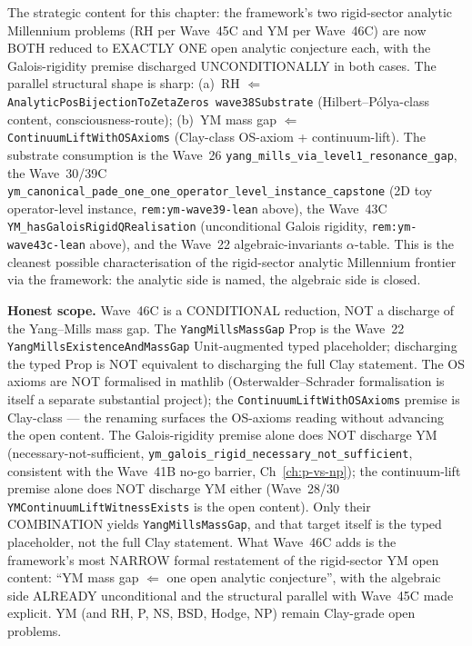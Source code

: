 \begin{remark}
\begin{itemize}
\end{itemize}
The strategic content for this chapter: the framework's two rigid-sector analytic Millennium problems (RH per Wave~45C and YM per Wave~46C) are now BOTH reduced to EXACTLY ONE open analytic conjecture each, with the Galois-rigidity premise discharged UNCONDITIONALLY in both cases. The parallel structural shape is sharp: (a)~RH $\Leftarrow$ \texttt{AnalyticPosBijectionToZetaZeros wave38Substrate} (Hilbert--P\'olya-class content, consciousness-route); (b)~YM mass gap $\Leftarrow$ \texttt{ContinuumLiftWithOSAxioms} (Clay-class OS-axiom + continuum-lift). The substrate consumption is the Wave~26 \texttt{yang\_mills\_via\_level1\_resonance\_gap}, the Wave~30/39C \texttt{ym\_canonical\_pade\_one\_one\_operator\_level\_instance\_capstone} (2D toy operator-level instance, \texttt{rem:ym-wave39-lean} above), the Wave~43C \texttt{YM\_hasGaloisRigidQRealisation} (unconditional Galois rigidity, \texttt{rem:ym-wave43c-lean} above), and the Wave~22 algebraic-invariants $\alpha$-table. This is the cleanest possible characterisation of the rigid-sector analytic Millennium frontier via the framework: the analytic side is named, the algebraic side is closed.

\textbf{Honest scope.} Wave~46C is a CONDITIONAL reduction, NOT a discharge of the Yang--Mills mass gap. The \texttt{YangMillsMassGap} Prop is the Wave~22 \texttt{YangMillsExistenceAndMassGap} Unit-augmented typed placeholder; discharging the typed Prop is NOT equivalent to discharging the full Clay statement. The OS axioms are NOT formalised in mathlib (Osterwalder--Schrader formalisation is itself a separate substantial project); the \texttt{ContinuumLiftWithOSAxioms} premise is Clay-class --- the renaming surfaces the OS-axioms reading without advancing the open content. The Galois-rigidity premise alone does NOT discharge YM (necessary-not-sufficient, \texttt{ym\_galois\_rigid\_necessary\_not\_sufficient}, consistent with the Wave~41B no-go barrier, Ch~\ref{ch:p-vs-np}); the continuum-lift premise alone does NOT discharge YM either (Wave~28/30 \texttt{YMContinuumLiftWitnessExists} is the open content). Only their COMBINATION yields \texttt{YangMillsMassGap}, and that target itself is the typed placeholder, not the full Clay statement. What Wave~46C adds is the framework's most NARROW formal restatement of the rigid-sector YM open content: ``YM mass gap $\Leftarrow$ one open analytic conjecture'', with the algebraic side ALREADY unconditional and the structural parallel with Wave~45C made explicit. YM (and RH, P, NS, BSD, Hodge, NP) remain Clay-grade open problems.
\end{remark}

